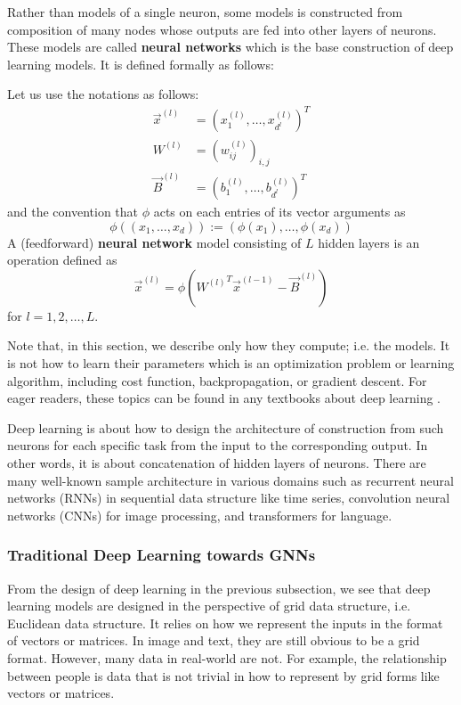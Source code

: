 Rather than models of a single neuron, some models is constructed from composition of many nodes whose outputs are fed into other layers of neurons.
These models are called \textbf{neural networks} which is the base construction of deep learning models.
It is defined formally as follows:

\begin{defi}
	Let us use the notations as follows:
	\begin{align*}
		\vec{x}^{(l)} &= (x_1^{(l)},\dots,x_{d^l}^{(l)})^T\\
		W^{(l)} &= (w_{ij}^{(l)})_{i,j}\\
		\vec{B}^{(l)} &= (b_1^{(l)},\dots,b_{d^l}^{(l)})^T
	\end{align*}
	and the convention that $\phi$ acts on each entries of its vector arguments as
	$$
	\phi ((x_1,\dots,x_d)) := (\phi(x_1), \dots, \phi(x_d))
	$$
	A (feedforward) \textbf{neural network} model consisting of $L$ hidden layers is an operation defined as
	$$
	\vec{x}^{(l)}=\phi\left({W^{(l)}}^T\vec{x}^{(l-1)} - \vec{B}^{(l)}\right)
	$$
	for $l = 1,2,\dots,L$.
\end{defi}

Note that, in this section, we describe only how they compute; i.e. the models.
It is not how to learn their parameters which is an optimization problem or learning algorithm, including cost function, backpropagation, or gradient descent.
For eager readers, these topics can be found in any textbooks about deep learning \cite{...}.

Deep learning is about how to design the architecture of construction from such neurons for each specific task from the input to the corresponding output.
In other words, it is about concatenation of hidden layers of neurons.
There are many well-known sample architecture in various domains such as recurrent neural networks (RNNs) \cite{...} in sequential data structure like time series, convolution neural networks (CNNs) \cite{...} for image processing, and transformers \cite{...} for language.


\subsubsection{Traditional Deep Learning towards GNNs}
From the design of deep learning in the previous subsection, we see that deep learning models are designed in the perspective of grid data structure, i.e. Euclidean data structure.
It relies on how we represent the inputs in the format of vectors or matrices.
In image and text, they are still obvious to be a grid format.
However, many data in real-world are not.
For example, the relationship between people is data that is not trivial in how to represent by grid forms like vectors or matrices.

